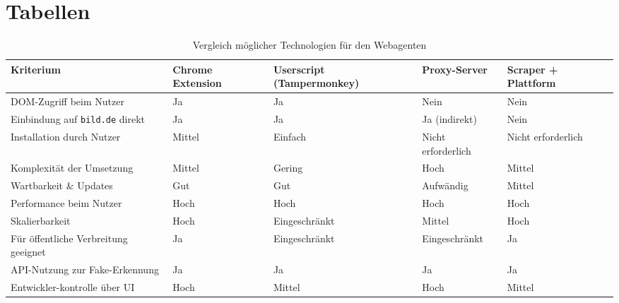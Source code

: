 \section{Tabellen}

\begin{table}[ht]
    \centering
    \renewcommand{\arraystretch}{1.3}
    \begin{tabular}{|p{2.5cm}|p{2.5cm}|p{2.5cm}|p{2.5cm}|p{2.5cm}|}
        \hline
        \textbf{Kriterium} & \textbf{Chrome Extension} & \textbf{Userscript (Tampermonkey)} & \textbf{Proxy-Server} & \textbf{Scraper + Plattform} \\
        \hline
        DOM-Zugriff beim Nutzer & Ja & Ja & Nein & Nein \\
        \hline
        Einbindung auf \texttt{bild.de} direkt & Ja & Ja & Ja (indirekt) & Nein \\
        \hline
        Installation durch Nutzer & Mittel & Einfach & Nicht erforderlich & Nicht erforderlich\\
        \hline
        Komplexität der Umsetzung & Mittel & Gering & Hoch & Mittel \\
        \hline
        Wartbarkeit \& Updates & Gut & Gut & Aufwändig & Mittel \\
        \hline
        Performance beim Nutzer & Hoch & Hoch & Hoch & Hoch \\
        \hline
        Skalierbarkeit & Hoch & Eingeschränkt & Mittel & Hoch \\
        \hline
        Für öffentliche Verbreitung geeignet & Ja & Eingeschränkt & Eingeschränkt & Ja \\
        \hline
        API-Nutzung zur Fake-Erkennung & Ja & Ja & Ja & Ja \\
        \hline
        Entwickler-kontrolle über UI & Hoch & Mittel & Hoch & Mittel \\
        \hline
    \end{tabular}
    \caption{Vergleich möglicher Technologien für den Webagenten}
    \label{table:technischeAnsaetze}
\end{table} %


